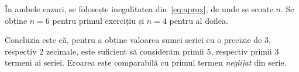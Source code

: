 În ambele cazuri, se folosește inegalitatea din~\eqref{eq:aprox}, de unde se 
scoate $ n $. Se obține $ n = 6 $ pentru primul exercițiu și $ n = 4 $ pentru
al doilea.

Concluzia este că, pentru a obține valoarea sumei seriei cu o precizie de 3, respectiv
2 zecimale, este suficient să considerăm primii 5, respectiv primii 3 termeni ai seriei. 
Eroarea este comparabilă cu primul termen \emph{neglijat} din serie.

